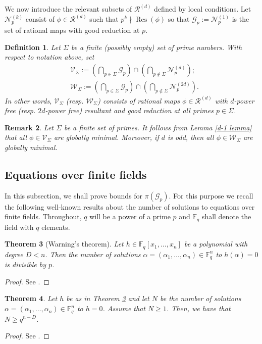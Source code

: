\documentclass[12pt]{amsart}
\newtheorem{theorem}{Theorem}[section]
\newtheorem{definition}[theorem]{Definition}
\newtheorem{remark}[theorem]{Remark}
\newcommand{\cN}{\mathcal{N}}
\newcommand{\cW}{\mathcal{W}}
\newcommand{\cG}{\mathcal{G}}
\newcommand{\F}{\mathbb{F}}
\newcommand{\cR}{\mathcal{R}}
\newcommand{\V}{\mathcal{V}}
\newcommand{\op}[1]{\operatorname{#1}}
\numberwithin{equation}{section}
\begin{document}
We now introduce the relevant subsets of $\cR^{(d)}$ defined by local conditions. Let $\cN_p^{(k)}$ consist of $\phi\in\cR^{(d)}$ such that $p^k\nmid \op{Res}(\phi)$ so that $\cG_p:=\cN_p^{(1)}$ is the set of rational maps with good reduction at $p$.
\begin{definition}
    Let $\Sigma$ be a finite (possibly empty) set of prime numbers. With respect to notation above, set \[\begin{split}&\mathcal{V}_\Sigma:=\left(\bigcap_{p\in \Sigma} \cG_p\right)\cap \left(\bigcap_{p\notin \Sigma} \cN_p^{(d)}\right); \\ 
& \mathcal{W}_\Sigma:=\left(\bigcap_{p\in \Sigma} \cG_p\right)\cap \left(\bigcap_{p\notin \Sigma} \cN_p^{(2d)}\right).
    \end{split}\]
    In other words, $\V_\Sigma$ (resp. $\cW_\Sigma$) consists of rational maps $\phi\in\cR^{(d)}$ with $d$-power free (resp. $2d$-power free) resultant and good reduction at all primes $p\in \Sigma$. 
\end{definition}
\begin{remark}\label{rem:V and W have globally minimal maps}
   Let $\Sigma$ be a finite set of primes. It follows from Lemma \ref{d-1 lemma} that all $\phi\in \V_\Sigma$ are globally minimal. Moreover, if $d$ is odd, then all $\phi\in \cW_{\Sigma}$ are globally minimal.
\end{remark}
\subsection{Equations over finite fields}
\par In this subsection, we shall prove bounds for $\pi(\cG_p)$. For this purpose we recall the following well-known results about the number of solutions to equations over finite fields. Throughout, $q$ will be a power of a prime $p$ and $\F_q$ shall denote the field with $q$ elements. 

\begin{theorem}[Warning's theorem]\label{warning}
    Let $h\in \F_q[x_1, \dots, x_n]$ be a polynomial with degree $D<n$. Then the number of solutions $\alpha=(\alpha_1, \dots, \alpha_n)\in \F_q^n$ to $h(\alpha)=0$ is divisible by $p$. 
\end{theorem}
\begin{proof}
    See \cite[Theorem 6.5]{lidlnied}.
\end{proof}



\begin{theorem}\label{lower bound for h theorem}
    Let $h$ be as in Theorem \ref{warning} and let $N$ be the number of solutions $\alpha=(\alpha_1, \dots, \alpha_n)\in \F_q^n$ to $h=0$. Assume that $N\geq 1$. Then, we have that $N\geq q^{n-D}$. 
\end{theorem}
\begin{proof}
    See \cite[Theorem 6.11]{lidlnied}.
\end{proof}
\end{document}
